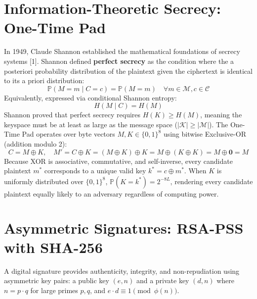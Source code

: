 \documentclass[12pt,a4paper]{report}
\begin{document}
\section{Information-Theoretic Secrecy: One-Time Pad}
In 1949, Claude Shannon established the mathematical foundations of secrecy systems [1]. Shannon defined \textbf{perfect secrecy} as the condition where the a posteriori probability distribution of the plaintext given the ciphertext is identical to its a priori distribution:
\begin{equation}
    \mathbb{P}(M = m \mid C = c) = \mathbb{P}(M = m) \quad \forall m \in \mathcal{M}, c \in \mathcal{C}
\end{equation}
Equivalently, expressed via conditional Shannon entropy:
\begin{equation}
    H(M \mid C) = H(M)
\end{equation}
Shannon proved that perfect secrecy requires $H(K) \ge H(M)$, meaning the keyspace must be at least as large as the message space ($|\mathcal{K}| \ge |\mathcal{M}|$). The One-Time Pad operates over byte vectors $M, K \in \{0, 1\}^8$ using bitwise Exclusive-OR (addition modulo 2):
\begin{equation}
    C = M \oplus K, \quad M' = C \oplus K = (M \oplus K) \oplus K = M \oplus (K \oplus K) = M \oplus \mathbf{0} = M
\end{equation}
Because XOR is associative, commutative, and self-inverse, every candidate plaintext $m^*$ corresponds to a unique valid key $k^* = c \oplus m^*$. When $K$ is uniformly distributed over $\{0, 1\}^8$, $\mathbb{P}(K = k^*) = 2^{-8L}$, rendering every candidate plaintext equally likely to an adversary regardless of computing power.

\section{Asymmetric Signatures: RSA-PSS with SHA-256}
A digital signature provides authenticity, integrity, and non-repudiation using asymmetric key pairs: a public key $(e, n)$ and a private key $(d, n)$ where $n = p \cdot q$ for large primes $p, q$, and $e \cdot d \equiv 1 \pmod{\phi(n)}$. 
\end{document}
